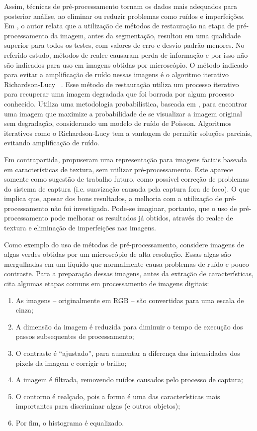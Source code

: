 Assim, técnicas de pré-processamento tornam os dados mais adequados para posterior análise, ao eliminar ou reduzir problemas como ruídos e imperfeições. Em , o autor relata que a utilização de métodos de restauração na etapa de pré-processamento da imagem, antes da segmentação, resultou em uma qualidade superior para todos os testes, com valores de erro e desvio padrão menores. No referido estudo, métodos de realce causaram perda de informação e por isso não são indicados para uso em imagens obtidas por microscópio. O método indicado para evitar a amplificação de ruído nessas imagens é o algoritmo iterativo Richardson-Lucy ~\cite{Ponti-Jr2011}. Esse método de restauração utiliza um processo iterativo para recuperar uma imagem degradada que foi borrada por algum processo conhecido. Utiliza uma metodologia probabilística, baseada em , para encontrar uma imagem que maximize a probabilidade de se visualizar a imagem original sem degradação, considerando um modelo de ruído de Poisson. Algoritmos iterativos como o Richardson-Lucy tem a vantagem de permitir soluções parciais, evitando amplificação de ruído.

Em contrapartida,  propuseram uma representação para imagens faciais baseada em características de textura, sem utilizar pré-processamento. Este aparece somente como sugestão de trabalho futuro, como possível correção de problemas do sistema de captura (i.e. suavização causada pela captura fora de foco). O que implica que, apesar dos bons resultados, a melhoria com a utilização de pré-processamento não foi investigada. Pode-se imaginar, portanto, que o uso de pré-processamento pode melhorar os resultados já obtidos, através do realce de textura e eliminação de imperfeições nas imagens.

Como exemplo do uso de métodos de pré-processamento, considere imagens de algas verdes obtidas por um microscópio de alta resolução. Essas algas são mergulhadas em um líquido que normalmente causa problemas de ruído e pouco contraste. Para a preparação dessas imagens, antes da extração de características,  cita algumas etapas comuns em processamento de imagens digitais:

\begin{enumerate}
\item As imagens -- originalmente em RGB -- são convertidas para uma escala de cinza;
\item A dimensão da imagem é reduzida para diminuir o tempo de execução dos passos subsequentes de processamento;
\item O contraste é ``ajustado'', para aumentar a diferença das intensidades dos pixels da imagem e corrigir o brilho;
\item A imagem é filtrada, removendo ruídos causados pelo processo de captura;
\item O contorno é realçado, pois a forma é uma das características mais importantes para discriminar algas (e outros objetos);
\item Por fim, o histograma é equalizado.
\end{enumerate}


